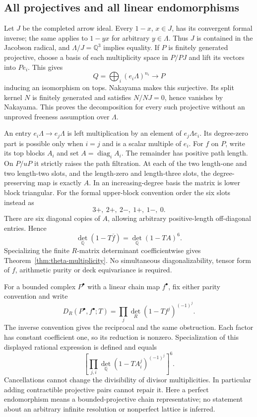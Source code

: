 \documentclass[11pt]{article}
\theoremstyle{definition}\newtheorem{definition}[theorem]{Definition}
\theoremstyle{remark}\newtheorem{remark}[theorem]{Remark}
\begin{document}
\subsection{All projectives and all linear endomorphisms}
Let $J$ be the completed arrow ideal. Every $1-x$, $x\in J$, has its convergent formal inverse; the same applies to $1-yx$ for arbitrary $y\in\Lambda$. Thus $J$ is contained in the Jacobson radical, and $\Lambda/J=\mathbb Q^3$ implies equality. If $P$ is finitely generated projective, choose a basis of each multiplicity space in $P/PJ$ and lift its vectors into $Pe_i$. This gives
\[
 Q=\bigoplus_i(e_i\Lambda)^{n_i}\longrightarrow P
\]
inducing an isomorphism on tops. Nakayama makes this surjective. Its split kernel $N$ is finitely generated and satisfies $N/NJ=0$, hence vanishes by Nakayama. This proves the decomposition for every such projective without an unproved freeness assumption over $\Lambda$.

An entry $e_i\Lambda\to e_j\Lambda$ is left multiplication by an element of $e_j\Lambda e_i$. Its degree-zero part is possible only when $i=j$ and is a scalar multiple of $e_i$. For $f$ on $P$, write its top blocks $A_i$ and set $A=\operatorname{diag}_iA_i$. The remainder has positive path length. On $P/uP$ it strictly raises the path filtration. At each of the two length-one and two length-two slots, and the length-zero and length-three slots, the degree-preserving map is exactly $A$. In an increasing-degree basis the matrix is lower block triangular. For the formal upper-block convention order the six slots instead as
\[
 3+,\ 2+,\ 2-,\ 1+,\ 1-,\ 0.
\]
There are six diagonal copies of $A$, allowing arbitrary positive-length off-diagonal entries. Hence
\[
 \det_{\mathbb Q}(1-T\overline f)=\det_{\mathbb Q}(1-TA)^6.
\]
Specializing the finite $R$-matrix determinant coefficientwise gives Theorem~\ref{thm:theta-multiplicity}. No simultaneous diagonalizability, tensor form of $f$, arithmetic purity or deck equivariance is required.

For a bounded complex $P^\bullet$ with a linear chain map $f^\bullet$, fix either parity convention and write
\[
 D_R(P^\bullet,f^\bullet;T)=\prod_j\det_R(1-Tf^j)^{(-1)^j}.
\]
The inverse convention gives the reciprocal and the same obstruction. Each factor has constant coefficient one, so its reduction is nonzero. Specialization of this displayed rational expression is defined and equals
\[
 \left[\prod_{j,i}\det_{\mathbb Q}(1-TA_i^j)^{(-1)^j}\right]^6.
\]
Cancellations cannot change the divisibility of divisor multiplicities. In particular adding contractible projective pairs cannot repair it. Here a perfect endomorphism means a bounded-projective chain representative; no statement about an arbitrary infinite resolution or nonperfect lattice is inferred.
\end{document}
